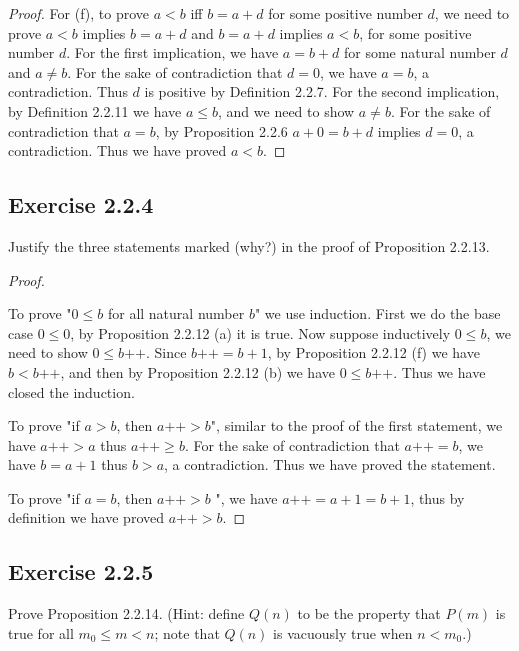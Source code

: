 \documentclass[a4paper]{article}
\begin{document}
\begin{proof}
For (f), to prove $a < b$ iff $b = a + d$ for some positive number $d$, we need to prove $a < b$ implies $b = a + d$ and $b = a + d$ implies $a < b$, for some positive number $d$. For the first implication, we have $a = b + d$ for some natural number $d$ and $a \neq b$. For the sake of contradiction that $d = 0$, we have $a = b$, a contradiction. Thus $d$ is positive by Definition 2.2.7. For the second implication, by Definition 2.2.11 we have $a \le b$, and we need to show $a \neq b$. For the sake of contradiction that $a = b$, by Proposition 2.2.6 $a + 0 = b + d$ implies $d = 0$, a contradiction. Thus we have proved $a < b$.

\end{proof} 
\subsection*{Exercise 2.2.4}

Justify the three statements marked (why?) in the proof of Proposition 2.2.13.

\begin{proof}

$ $\newline

To prove "$0 \le b$ for all natural number $b$" we use induction. First we do the base case $0 \le 0$, by Proposition 2.2.12 (a) it is true. Now suppose inductively $0 \le b$, we need to show $0 \le b\text{++}$. Since $b\text{++} = b + 1$, by Proposition 2.2.12 (f) we have $b < b\text{++}$, and then by Proposition 2.2.12 (b) we have $0 \le b\text{++}$. Thus we have closed the induction.

To prove "if $a > b$, then $a\text{++} > b$", similar to the proof of the first statement, we have $a\text{++} > a$ thus $a\text{++} \ge b$. For the sake of contradiction that $a\text{++} = b$, we have $b = a + 1$ thus $b > a$, a contradiction. Thus we have proved the statement.

To prove "if  $a = b$, then $a\text{++} > b$ ", we have $a\text{++} = a + 1 = b + 1$, thus by definition we have proved $a\text{++} > b$.

\end{proof}

\subsection*{Exercise 2.2.5}

Prove Proposition 2.2.14. (Hint: define $Q(n)$ to be the property that $P(m)$ is true for all $m_0 \le m < n$; note that $Q(n)$ is vacuously true when $n < m_0$.)
\end{document}
